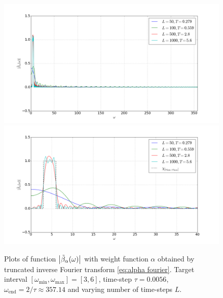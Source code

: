 \documentclass[a4paper,11pt,bibliography=totoc,listof=totoc,headinclude=true,cleardoublepage=empty,oneside]{scrbook}
\newcommand{\dff}{\Tilde{\beta}_\alpha}
\newcommand{\e}{\mathrm{end}}
\begin{document}
\begin{figure}[h]
    \centering
    \includegraphics[width=0.75\linewidth]{latex//images//fourier/Figure_1.png}
    \includegraphics[width=0.75\linewidth]{latex//images//fourier/Figure_2.png}
    \caption{Plots of function $\left|\dff(\omega) \right|$ with weight function $\alpha$ obtained by truncated inverse Fourier transform \eqref{eq:alpha fourier}. Target interval $\left[\omega_{\min}, \omega_{\max} \right] = [3, 6]$, time-step $\tau = 0.0056$, $\omega_\e = 2/\tau \approx 357.14$ and varying number of time-steps $L$. }
    \label{fig:fourier1}
\end{figure}
\end{document}
